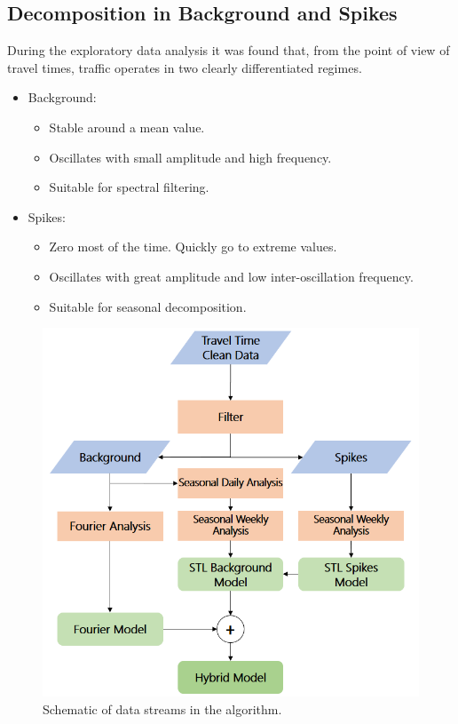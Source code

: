 \documentclass[conference]{IEEEtran}
\begin{document}
\subsection{Decomposition in Background and Spikes}
During the exploratory data analysis it was found that, from the point of view of travel times, traffic operates in two clearly differentiated regimes. 
\begin{itemize}
	\item Background: 
	\begin{itemize}
		\item Stable around a mean value.
		\item Oscillates with small amplitude and high frequency.
		\item Suitable for spectral filtering.
	\end{itemize}
	\item Spikes: 
	\begin{itemize}
		\item Zero most of the time. Quickly go to extreme values.
		\item Oscillates with great amplitude and low inter-oscillation frequency.
		\item Suitable for seasonal decomposition.
	\end{itemize}
\end{itemize}

\begin{figure}[htbp]
	\centering
	\includegraphics[width=\linewidth]{new_flow.png}
	\caption{Schematic of data streams in the algorithm.}
	\label{fig:flowchart}
\end{figure}
\end{document}
